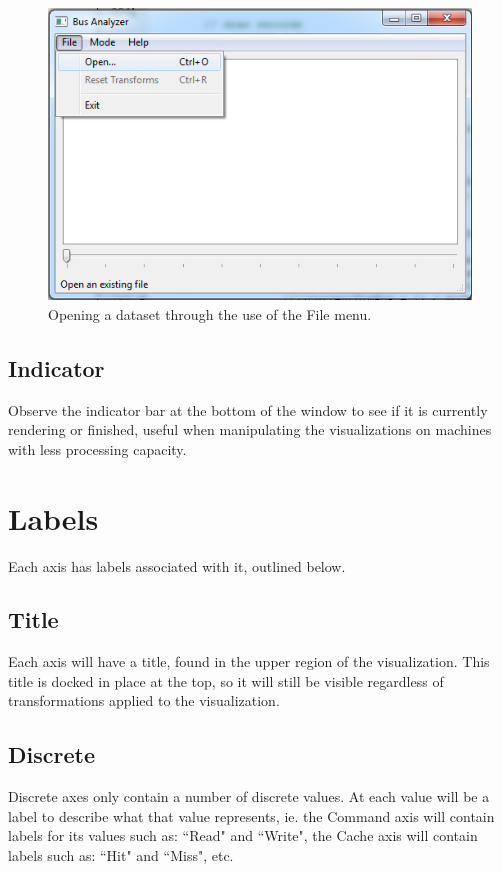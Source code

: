 \documentclass[12pt]{ucthesis}
\begin{document}
\begin{figure}[htb!]
 \centering
 \includegraphics[width=\textwidth]{images/documentation/open.jpg}
 \caption[Opening a dataset through the use of the File menu.]{Opening a dataset through the use of the File menu.}
 \label{fig:doc}
\end{figure}

\subsection{Indicator}
Observe the indicator bar at the bottom of the window to see if it is currently rendering or finished, useful when manipulating the visualizations on machines with less processing capacity.

\section{Labels}
Each axis has labels associated with it, outlined below.

\subsection{Title}
Each axis will have a title, found in the upper region of the visualization. This title is docked in place at the top, so it will still be visible regardless of transformations applied to the visualization.

\subsection{Discrete}
Discrete axes only contain a number of discrete values. At each value will be a label to describe what that value represents, ie. the Command axis will contain labels for its values such as: ``Read" and ``Write", the Cache axis will contain labels such as: ``Hit" and ``Miss", etc.
\end{document}
